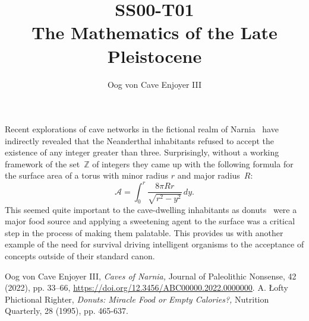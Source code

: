 \documentclass[11pt]{ximera}
\title{SS00-T01 \\ The Mathematics of the Late Pleistocene}
\author{Oog von Cave Enjoyer III}
\affil{Swedish Spelunking Academy}
\date{}
\begin{document}
\begin{abstract}
\end{abstract}
\maketitle
{}
Recent explorations of cave networks in the fictional realm of
Narnia~\cite{OvCE} have indirectly revealed that the Neanderthal
inhabitants refused to accept the existence of any integer greater than
three.  Surprisingly, without a working framework of the 
set~\(\mathbb Z\) of integers they came up with the following formula
for the surface area of a torus with minor radius \(r\) and major 
radius~\(R\):
    \[\mathscr A = \int_{0}^{r}\frac{8 \pi Rr}{\sqrt{r^2-y^2}}\,dy.\]
This seemed quite important to the cave-dwelling inhabitants as
donuts~\cite{ALPW} were a major food source and applying a sweetening 
agent to the surface was a critical step in the process of making them 
palatable.  This provides us with another example of the need for
survival driving intelligent organisms to the acceptance of concepts
outside of their standard canon.
\begin{thebibliography}{2}
     Oog von Cave Enjoyer III, {\it Caves of Narnia,\/} 
    Journal of Paleolithic Nonsense, 42 (2022), pp. 33--66, 
    \url{https://doi.org/12.3456/ABC00000.2022.0000000}.
     A. \L ofty Phictional Righter, {\it Donuts: Miracle
    Food or Empty Calories?,\/} Nutrition Quarterly, 28 (1995), pp. 
    465-637.
\end{thebibliography}
\end{document}
